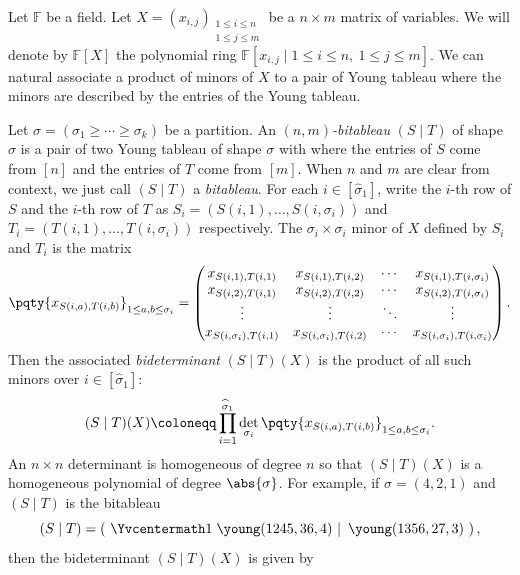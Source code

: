 \documentclass[10pt,a4paper]{amsart}
\newcommand*\F{\mathbb{F}}
\newcommand*\defeq{\coloneqq}
\begin{document}
Let $\F$ be a field.
Let $X = (x_{i, j})_{\substack{1 \leq i \leq n \\ 1 \leq j \leq m}}$ be a $n \times m$ matrix of variables.
We will denote by $\F[X]$ the polynomial ring $\F[x_{i, j} \mid 1 \leq i \leq n,\ 1 \leq j \leq m]$.
We can natural associate a product of minors of $X$ to a pair of Young tableau where the minors are described by the entries of the Young tableau.
\begin{defn}\label{defn:bitableau}
    Let $\sigma = (\sigma_1 \geq \cdots \geq \sigma_k)$ be a partition.
    An \emph{$(n, m)$-bitableau} $(S \mid T)$ of shape $\sigma$ is a pair of two Young tableau of shape $\sigma$ with where the entries of $S$ come from $[n]$ and the entries of $T$ come from $[m]$.
    When $n$ and $m$ are clear from context, we just call $(S \mid T)$ a \emph{bitableau}.
    For each $i\in [\widehat{\sigma}_1]$, write the $i$-th row of $S$ and the $i$-th row of $T$ as $S_i = (S(i, 1), \ldots, S(i, \sigma_i))$ and $T_i = (T(i, 1), \ldots,  T(i, \sigma_i))$ respectively.
    The $\sigma_i \times \sigma_i$ minor of $X$ defined by $S_i$ and $T_i$ is the matrix
    \[
        \pqty{x_{S(i, a), T(i, b)}}_{1 \leq a, b \leq \sigma_i} = 
            \begin{pmatrix}
                x_{S(i, 1), T(i, 1)}        & x_{S(i, 1), T(i, 2)}        & \cdots & x_{S(i, 1), T(i, \sigma_i)} \\
                x_{S(i, 2), T(i, 1)}        & x_{S(i, 2), T(i, 2)}        & \cdots & x_{S(i, 2), T(i, \sigma_i)} \\
                \vdots                      & \vdots                      & \ddots & \vdots \\
                x_{S(i, \sigma_i), T(i, 1)} & x_{S(i, \sigma_i), T(i, 2)} & \cdots & x_{S(i, \sigma_i), T(i, \sigma_i)}
            \end{pmatrix}.
    \]
    Then the associated \emph{bideterminant} $(S \mid T)(X)$ is the product of all such minors over $i\in [\widehat{\sigma}_1]$:
    \[
        (S \mid T)(X) \defeq \prod_{i = 1}^{\widehat{\sigma}_1} \det_{\sigma_i}\pqty{x_{S(i, a), T(i, b)}}_{1 \leq a, b \leq \sigma_i}.
    \]
    An $n \times n$ determinant is homogeneous of degree $n$ so that $(S \mid T)(X)$ is a homogeneous polynomial of degree $\abs{\sigma}$.
    For example, if $\sigma = (4, 2, 1)$ and $(S \mid T)$ is the bitableau
    \[
        (S \mid T) = \left(\ \Yvcentermath1 \left. \young(1245,36,4)\ \right\vert\ \young(1356,27,3) \ \right),
    \]
    then the bideterminant $(S \mid T)(X)$ is given by

\end{defn}
\end{document}
